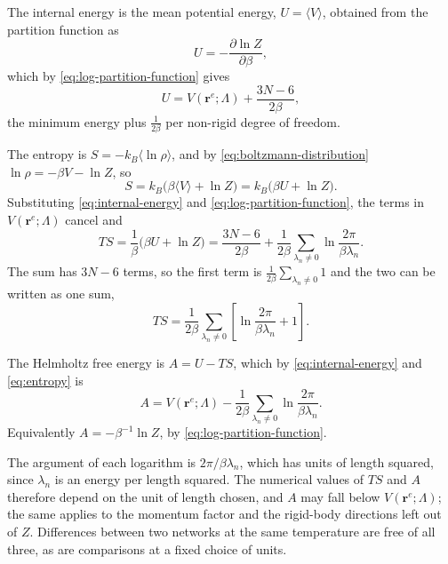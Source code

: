 \documentclass[11pt]{article}
\newcommand{\rr}{\mathbf{r}}
\newcommand{\LL}{\Lambda}
\newcommand{\re}{\rr^{e}}
\begin{document}
The internal energy is the mean potential energy, $U = \langle V \rangle$, obtained from the partition function as
\begin{equation}
U = -\frac{\partial \ln Z}{\partial \beta} ,
\end{equation}
which by \eqref{eq:log-partition-function} gives
\begin{equation}
\boxed{
U = V(\re;\LL) + \frac{3N-6}{2\beta} ,
}
\label{eq:internal-energy}
\end{equation}
the minimum energy plus $\tfrac{1}{2\beta}$ per non-rigid degree of freedom.

The entropy is $S = -k_B \langle \ln \rho \rangle$, and by \eqref{eq:boltzmann-distribution} $\ln\rho = -\beta V - \ln Z$, so
\begin{equation}
S = k_B \big( \beta \langle V \rangle + \ln Z \big)
= k_B \big( \beta U + \ln Z \big) .
\end{equation}
Substituting \eqref{eq:internal-energy} and \eqref{eq:log-partition-function}, the terms in $V(\re;\LL)$ cancel and
\begin{equation}
T S = \frac{1}{\beta}\big( \beta U + \ln Z \big)
= \frac{3N-6}{2\beta} + \frac{1}{2\beta} \sum_{\lambda_n \ne 0} \ln\frac{2\pi}{\beta\lambda_n} .
\end{equation}
The sum has $3N-6$ terms, so the first term is $\tfrac{1}{2\beta}\sum_{\lambda_n \ne 0} 1$ and the two can be written as one sum,
\begin{equation}
\boxed{
T S = \frac{1}{2\beta}\sum_{\lambda_n \ne 0}
\left[\ln\frac{2\pi}{\beta\lambda_n} + 1\right] .
}
\label{eq:entropy}
\end{equation}

The Helmholtz free energy is $A = U - TS$, which by \eqref{eq:internal-energy} and \eqref{eq:entropy} is
\begin{equation}
\boxed{
A = V(\re;\LL) - \frac{1}{2\beta}\sum_{\lambda_n \ne 0} \ln\frac{2\pi}{\beta\lambda_n} .
}
\label{eq:free-energy}
\end{equation}
Equivalently $A = -\beta^{-1}\ln Z$, by \eqref{eq:log-partition-function}.

The argument of each logarithm is $2\pi/\beta\lambda_n$, which has units of length squared, since $\lambda_n$ is an energy per length squared.
The numerical values of $TS$ and $A$ therefore depend on the unit of length chosen, and $A$ may fall below $V(\re;\LL)$; the same applies to the momentum factor and the rigid-body directions left out of $Z$.
Differences between two networks at the same temperature are free of all three, as are comparisons at a fixed choice of units.
\end{document}
